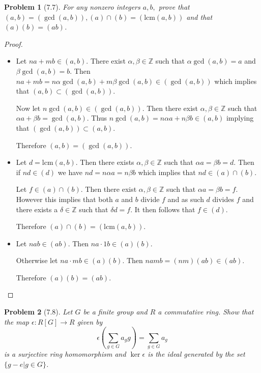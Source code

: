 \documentclass[10pt]{article}
\newcommand{\sk}{\vskip 10mm}
\newcommand{\bb}[1]{\mathbb{#1}}
\theoremstyle{plain}
\newtheorem{problem}{Problem}
\theoremstyle{remark}
\begin{document}
\sk

\begin{problem}[7.7]
  For any nonzero integers $a,b,$ prove that
  $(a,b)=(\gcd(a,b)),(a)\cap(b)=(\text{lcm}(a,b))$
  and that $(a)(b)=(ab)$.
\end{problem}

\begin{proof}
  \begin{itemize}
  \item Let $na+mb\in (a,b)$. There exist $\alpha,\beta\in\bb{Z}$ such that
    $\alpha \gcd(a,b)=a$ and $\beta\gcd(a,b)=b$.
    Then $na+mb=n\alpha\gcd(a,b)+m\beta\gcd(a,b)\in(\gcd(a,b))$ which implies that
    $(a,b)\subset(\gcd(a,b))$.

    Now let $n\gcd(a,b)\in(\gcd(a,b))$. Then there exist $\alpha,\beta\in\bb{Z}$ such
    that $\alpha a+\beta b = \gcd(a,b)$. Thus $n\gcd(a,b)=n\alpha a+n\beta b\in (a,b)$ implying
    that $(\gcd(a,b))\subset(a,b)$.

    Therefore $(a,b)=(\gcd(a,b))$.
  \item Let $d=\text{lcm}(a,b)$. Then there exists $\alpha,\beta\in\bb{Z}$ such that
    $\alpha a= \beta b= d$. Then if $nd\in(d)$ we have $nd=n\alpha a = n\beta b$ which implies
    that $nd\in(a)\cap(b)$.

    Let $f\in(a)\cap(b)$. Then there exist $\alpha,\beta\in\bb{Z}$ such that $\alpha a = \beta b = f$.
    However this implies that both $a$ and $b$ divide $f$ and as such
    $d$ divides $f$ and there exists a $\delta\in\bb{Z}$ such that $\delta d=f$.
    It then follows that $f\in(d)$.

    Therefore $(a)\cap(b)=(\text{lcm}(a,b))$.
  \item Let $nab\in (ab)$. Then $na\cdot 1b\in(a)(b)$.

    Otherwise let $na\cdot mb\in(a)(b)$. Then $namb=(nm)(ab)\in(ab)$.

    Therefore $(a)(b)=(ab)$.
  \end{itemize}
\end{proof}

\sk

\begin{problem}[7.8]
  Let $G$ be a finite group and $R$ a commutative ring. Show that the map
  $\epsilon:R[G]\rightarrow R$ given by
  \[ \epsilon\left(\sum_{g\in G}a_gg\right)=\sum_{g\in G}a_g \]
  is a surjective ring homomorphism and $\ker \epsilon$ is the ideal generated by
  the set $\{g-e|g\in G\}$.
\end{problem}
\end{document}
